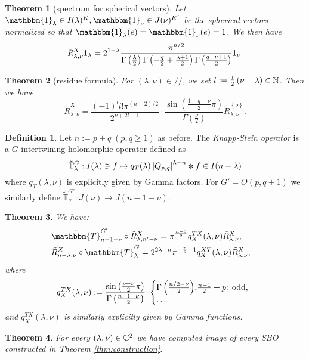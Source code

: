 \documentclass[12pt]{article} %
\newcommand{\Conv}{\mathop{\scalebox{1.5}{\raisebox{-0.2ex}{$\ast$}}}}
\newcommand{\assign}{:=}
\newtheorem{theorem}{Theorem}
\theoremstyle{definition}
\newtheorem{definition}{Definition}
\theoremstyle{exampstyle} \newtheorem{examp}[theorem]{Theorem}
\newcommand{\OpR}{\mbox{\it R}}
\renewcommand{\Q}{Q_{p,q}}
\newcommand{\todd}{\mbox{\textrm{: odd}}}
\begin{document}
\vspace{-2ex}
\begin{theorem}[spectrum for spherical vectors]
Let $\mathbbm{1}_\lambda\in I(\lambda)^K,\mathbbm{1}_\nu\in J(\nu)^{K'}$ be the spherical vectors normalized so that $\mathbbm{1}_\lambda(e)=\mathbbm{1}_\nu(e)=1$. We then have\vspace{-3.0ex}
	\[ \OpR^X_{\lambda, \nu} 1_{\lambda} = 2^{1 -
     \lambda} \frac{\pi^{n / 2}}{\Gamma \left( \frac{\lambda}{2} \right)
     \Gamma \left( - \frac{q}{2} + \frac{\lambda + 1}{2} \right) \Gamma \left(
     \frac{q - \nu + 1}{2} \right)} 1_{\nu}.\]
\end{theorem}
\vspace{-2ex}
\begin{theorem}[residue formula]
	For $(\lambda,\nu)\in//$, we set $l:=\frac{1}{2}\left( \nu-\lambda \right)\in\mathbb{N}$. Then we have
  \[\tilde{R}_{\lambda,\nu}^X  = \frac{ (- 1)^l l!\pi^{(n - 2) / 2} 
		}{2^{ \nu + 2 l-1}}\cdot  \frac{\sin\left( \frac{1+q-\nu}{2}\pi \right)}{\Gamma\left( \frac{\nu}{2} \right)}
	\tilde{R}_{\lambda,\nu}^{ \left\{ o \right\} }.\]
	\end{theorem}
	\begin{definition}
		Let $n:=p+q\;(p,q\ge1)$ as before.
		The {\it Knapp-Stein operator} is a $G$-intertwining holomorphic operator defined as
		\begin{equation*}
		\tilde{\mathbb{T}}_{\lambda}^G:I(\lambda)\ni f\mapsto q_T(\lambda)\myabs{\Q}^{\lambda-n}\Conv f\in I(n-\lambda)
		\end{equation*}
		where $q_T(\lambda,\nu)$ is explicitly given by Gamma factors.
		For $G'=O(p,q+1)$ we similarly define $\tilde{\mathbb{T}}^{G'}_\nu:J(\nu)\to J(n-1-\nu)$.
	\end{definition}
	\begin{theorem}
		
		We have:
\begin{eqnarray}
    & \tilde{\mathbbm{T}}^{G'}_{n-1 - \nu} \circ \tilde{R}^X_{\lambda, n' - \nu} =\pi^{\frac{n - 3}{2}} q^{T X}_X
  (\lambda, \nu) \tilde{R}^X_{\lambda, \nu}, &  \nonumber\\
  & \tilde{R}_{n - \lambda, \nu}^X \circ \tilde{\mathbbm{T}}^G_{\lambda} =2^{2\lambda-n}\pi^{-\frac{n}{2}-1} q^{X T}_X
  (\lambda, \nu) \tilde{R}_{\lambda, \nu}^X, &  \nonumber
  \end{eqnarray}
  where
  \begin{gather*}
  q^{T X}_X (\lambda, \nu) \assign\frac{\sin\left( \frac{p-\nu}{2} \pi\right)}{\Gamma\left( \frac{n-1-\nu}{2} \right)} \ \left\{
	  \begin{array}{@{}l@{}l}
    {\Gamma\left( \frac{n / 2 - \nu}{2} \right)}, & \frac{n - 1}{2}+p\todd,\\
    \dots&
  \end{array} \right.
\end{gather*}
and $q_X^{TX}(\lambda,\nu)$ is similarly explicitly given by Gamma functions.
	\end{theorem}
	\begin{theorem}
		For every $(\lambda,\nu)\in\mathbb{C}^2$ we have computed image of every SBO constructed in Theorem \ref{thm:construction}.
	\end{theorem}
\nocite{kobayashi2015program}
\small


\end{document}
